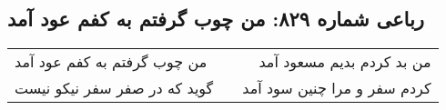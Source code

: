 \begin{center}
\section*{رباعی شماره ۸۲۹: من چوب گرفتم به کفم عود آمد}
\label{sec:0829}
\begin{longtable}{l p{0.5cm} r}
من چوب گرفتم به کفم عود آمد
&&
من بد کردم بدیم مسعود آمد
\\
گوید که در صفر سفر نیکو نیست
&&
کردم سفر و مرا چنین سود آمد
\\
\end{longtable}
\end{center}
